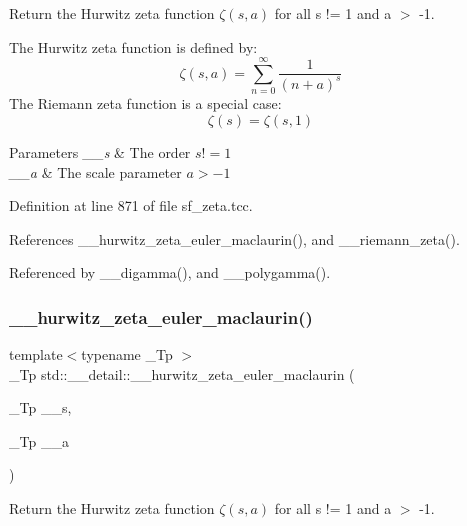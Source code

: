 Return the Hurwitz zeta function $ \zeta(s,a) $ for all s != 1 and a $>$ -\/1. 

The Hurwitz zeta function is defined by\+: \[ \zeta(s,a) = \sum_{n=0}^{\infty} \frac{1}{(n+a)^s} \] The Riemann zeta function is a special case\+: \[ \zeta(s) = \zeta(s,1) \]


\begin{DoxyParams}{Parameters}
{\em \+\_\+\+\_\+s} & The order $ s != 1 $ \\
\hline
{\em \+\_\+\+\_\+a} & The scale parameter $ a > -1 $ \\
\hline
\end{DoxyParams}


Definition at line 871 of file sf\+\_\+zeta.\+tcc.



References \+\_\+\+\_\+hurwitz\+\_\+zeta\+\_\+euler\+\_\+maclaurin(), and \+\_\+\+\_\+riemann\+\_\+zeta().



Referenced by \+\_\+\+\_\+digamma(), and \+\_\+\+\_\+polygamma().

\mbox{\label{namespacestd_1_1____detail_a56c55858723fe9e0c541f0e77572b58d}} 
\subsubsection{\texorpdfstring{\+\_\+\+\_\+hurwitz\+\_\+zeta\+\_\+euler\+\_\+maclaurin()}{\_\_hurwitz\_zeta\_euler\_maclaurin()}}
{\footnotesize\ttfamily template$<$typename \+\_\+\+Tp $>$ \\
\+\_\+\+Tp std\+::\+\_\+\+\_\+detail\+::\+\_\+\+\_\+hurwitz\+\_\+zeta\+\_\+euler\+\_\+maclaurin (\begin{DoxyParamCaption}\item[{\+\_\+\+Tp}]{\+\_\+\+\_\+s,  }\item[{\+\_\+\+Tp}]{\+\_\+\+\_\+a }\end{DoxyParamCaption})}



Return the Hurwitz zeta function $ \zeta(s,a) $ for all s != 1 and a $>$ -\/1. 

